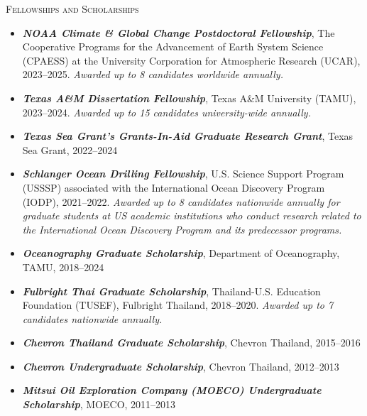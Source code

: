 \documentclass[10pt]{article}
\newcommand{\margintext}[1]{\marginnote{\normalsize\textbf #1 |}}
\begin{document}
\pagestyle{fancy}

\fancyfoot{} %

\bigskip
\margintext{Awards}
\textsc{Fellowships and Scholarships}
\begin{itemize}[leftmargin=*]
    \item[] \emph{\textbf{NOAA Climate \& Global Change Postdoctoral Fellowship}}, The Cooperative Programs for the Advancement of Earth System Science (CPAESS) at the University Corporation for Atmospheric Research (UCAR), 2023–2025. {\color{gray}\textit{Awarded up to 8 candidates worldwide annually.}}
    \item[] \emph{\textbf{Texas A\&M Dissertation Fellowship}}, Texas A\&M University (TAMU), 2023–2024. {\color{gray}\textit{Awarded up to 15 candidates university-wide annually.}}
    \item[] \emph{\textbf{Texas Sea Grant's Grants-In-Aid Graduate Research Grant}}, Texas Sea Grant, 2022–2024
    \item[] \emph{\textbf{Schlanger Ocean Drilling Fellowship}}, U.S. Science Support Program (USSSP) associated with the International Ocean Discovery Program (IODP), 2021–2022.  {\color{gray}\textit{Awarded up to 8 candidates nationwide annually for graduate students at US academic institutions who conduct research related to the International Ocean Discovery Program and its predecessor programs.}}
    \item[] \emph{\textbf{Oceanography Graduate Scholarship}}, Department of Oceanography, TAMU, 2018–2024
    \item[] \emph{\textbf{Fulbright Thai Graduate Scholarship}}, Thailand-U.S. Education Foundation (TUSEF), Fulbright Thailand, 2018–2020. {\color{gray}\textit{Awarded up to 7 candidates nationwide annually.}}
    \item[] \emph{\textbf{Chevron Thailand Graduate Scholarship}}, Chevron Thailand, 2015–2016
    \item[] \emph{\textbf{Chevron Undergraduate Scholarship}}, Chevron Thailand, 2012–2013
    \item[] \emph{\textbf{Mitsui Oil Exploration Company (MOECO) Undergraduate Scholarship}}, MOECO, 2011–2013 
\end{itemize}
\end{document}
